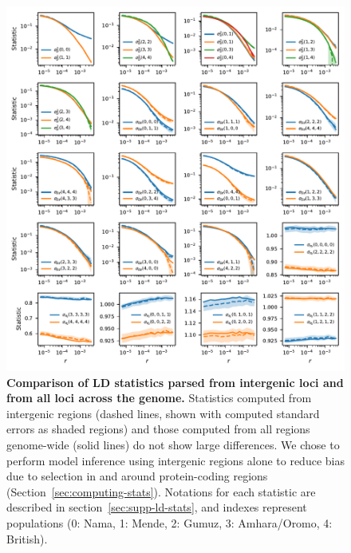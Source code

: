 \documentclass[]{article}
\begin{document}
\begin{figure}[ht]
    \centering
    \includegraphics{figures/supp-intergenic-all-snps-comparison.pdf}
    \caption{
        \textbf{Comparison of LD statistics parsed from intergenic loci and
        from all loci across the genome.} Statistics computed from intergenic
        regions (dashed lines, shown with computed standard errors as shaded
        regions) and those computed from all regions genome-wide (solid lines)
        do not show large differences. We chose to perform model inference
        using intergenic regions alone to reduce bias due to selection in and
        around protein-coding regions (Section~\ref{sec:computing-stats}).
        Notations for each statistic are described in
        section~\ref{sec:supp-ld-stats}, and indexes represent populations (0:
        Nama, 1: Mende, 2: Gumuz, 3: Amhara/Oromo, 4: British).
    }
    \label{fig:supp-inter-all-comparison}
\end{figure}
\end{document}
